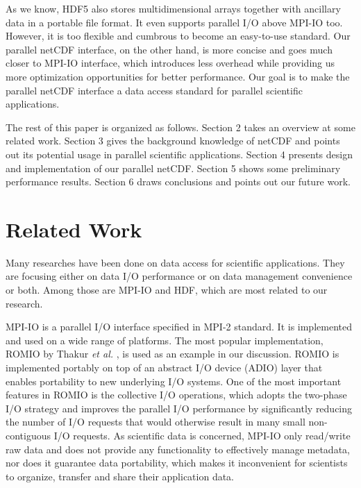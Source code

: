 \documentclass[10pt,twocolumn]{article}          %
\begin{document}
As we know, HDF5 \cite{HDF5} also stores multidimensional arrays together with ancillary data in a
portable file format. It even supports parallel I/O above MPI-IO too. However, it is too flexible
and cumbrous to become an easy-to-use standard. Our parallel netCDF interface, on the other hand,
is more concise and goes much closer to MPI-IO interface, which introduces less overhead while
providing us more optimization opportunities for better performance. Our goal is to make the
parallel netCDF interface a data access standard for parallel scientific applications.

The rest of this paper is organized as follows. Section 2 takes an overview at some related work.
Section 3 gives the background knowledge of netCDF and points out its potential usage in parallel
scientific applications. Section 4 presents design and implementation of our parallel netCDF.
Section 5 shows some preliminary performance results. Section 6 draws conclusions and points out
our future work.


\section{Related Work}

Many researches have been done on data access for scientific applications. They are focusing either
on data I/O performance or on data management convenience or both. Among those are MPI-IO and HDF,
which are most related to our research.

MPI-IO is a parallel I/O interface specified in MPI-2 standard. It is implemented and used on a
wide range of platforms. The most popular implementation, ROMIO by Thakur {\em et al.}
\cite{TRLG02}, is used as an example in our discussion. ROMIO is implemented portably on top of an
abstract I/O device (ADIO) layer \cite{ThGL96,ThGL99b} that enables portability to new underlying
I/O systems. One of the most important features in ROMIO is the collective I/O operations, which
adopts the two-phase I/O strategy \cite{RoBC93,TBCP94,ThCh96,ThGL99} and improves the parallel I/O
performance by significantly reducing the number of I/O requests that would otherwise result in
many small non-contiguous I/O requests. As scientific data is concerned, MPI-IO only read/write raw
data and does not provide any functionality to effectively manage metadata, nor does it guarantee
data portability, which makes it inconvenient for scientists to organize, transfer and share their
application data.
\end{document}
